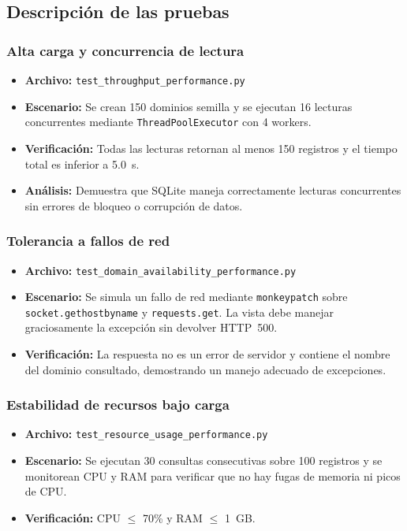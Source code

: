 \documentclass[12pt,a4paper]{article}
\begin{document}
\subsection{Descripción de las pruebas}

\subsubsection{Alta carga y concurrencia de lectura}

\begin{itemize}
  \item \textbf{Archivo:} \texttt{test\_throughput\_performance.py}
  \item \textbf{Escenario:} Se crean 150 dominios semilla y se ejecutan 16 lecturas
        concurrentes mediante \texttt{ThreadPoolExecutor} con 4 workers.
  \item \textbf{Verificación:} Todas las lecturas retornan al menos 150 registros y el
        tiempo total es inferior a 5.0~s.
  \item \textbf{Análisis:} Demuestra que SQLite maneja correctamente lecturas concurrentes
        sin errores de bloqueo o corrupción de datos.
\end{itemize}

\subsubsection{Tolerancia a fallos de red}

\begin{itemize}
  \item \textbf{Archivo:} \texttt{test\_domain\_availability\_performance.py}
  \item \textbf{Escenario:} Se simula un fallo de red mediante \texttt{monkeypatch} sobre
        \texttt{socket.gethostbyname} y \texttt{requests.get}. La vista debe manejar
        graciosamente la excepción sin devolver HTTP~500.
  \item \textbf{Verificación:} La respuesta no es un error de servidor y contiene el nombre
        del dominio consultado, demostrando un manejo adecuado de excepciones.
\end{itemize}

\subsubsection{Estabilidad de recursos bajo carga}

\begin{itemize}
  \item \textbf{Archivo:} \texttt{test\_resource\_usage\_performance.py}
  \item \textbf{Escenario:} Se ejecutan 30 consultas consecutivas sobre 100 registros y se
        monitorean CPU y RAM para verificar que no hay fugas de memoria ni picos de CPU.
  \item \textbf{Verificación:} CPU $\leq$ 70\% y RAM $\leq$ 1~GB.
\end{itemize}
\end{document}
